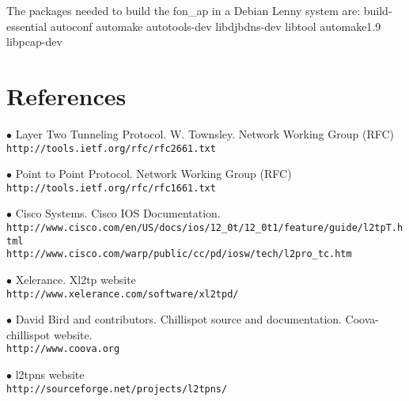 The packages needed to build the fon\_ap in a Debian Lenny system are:
\begintt
build-essential autoconf automake autotools-dev libdjbdns-dev 
libtool automake1.9 libpcap-dev
\endtt

%

\section{References}

\item {$\bullet$} Layer Two Tunneling Protocol. W. Townsley. Network Working Group (RFC)\\
	{\tt http://tools.ietf.org/rfc/rfc2661.txt}
\item {$\bullet$} Point to Point Protocol. Network Working Group (RFC)\\
	{\tt http://tools.ietf.org/rfc/rfc1661.txt}
\item {$\bullet$} Cisco Systems. Cisco IOS Documentation.\\
	{\tt http://www.cisco.com/en/US/docs/ios/12\_0t/12\_0t1/feature/guide/l2tpT.html}\\
	{\tt http://www.cisco.com/warp/public/cc/pd/iosw/tech/l2pro\_tc.htm}
\item {$\bullet$} Xelerance. Xl2tp website\\
	{\tt http://www.xelerance.com/software/xl2tpd/}
\item {$\bullet$} David Bird and contributors. Chillispot source and documentation. Coova-chillispot website.\\
	{\tt http://www.coova.org}
\item {$\bullet$} l2tpns website \\
	{\tt http://sourceforge.net/projects/l2tpns/}
\bye

